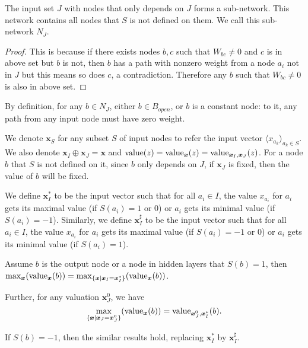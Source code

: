 				\begin{lemma}\label{lem:subnetwork2}
					The input set $J$ with nodes that only depends on $J$ forms a sub-network. This network contains all nodes that $S$ is not defined on them. We call this sub-network $N_J$.
				\end{lemma}
				
				\begin{proof}
					This is because if there exists nodes $b,c$ such that $W_{bc}\neq 0$ and $c$ is in above set but $b$ is not, then $b$ has a path with nonzero weight from a node $a_i$ not in $J$ but this means so does $c$, a contradiction. Therefore any $b$ such that $W_{bc}\neq 0$ is also in above set.
				\end{proof}
				
				By definition, for any $b\in N_J$, either $b\in B_{open}$, or $b$ is a constant node: to it, any path from any input node must have zero weight.
				
				We denote $\boldsymbol{x}_S$ for any subset $S$ of input nodes to refer the input vector $\langle x_{a_k}\rangle_{a_k\in S}$. We also denote $\boldsymbol{x}_I\oplus \boldsymbol{x}_J = \boldsymbol{x}$ and ${\textrm{value}}(z)={\textrm{value}}_{\boldsymbol{x}}(z)={\textrm{value}}_{\boldsymbol{x}_I,\boldsymbol{x}_J} (z)$. For a node $b$ that $S$ is not defined on it, since $b$ only depends on $J$, if $\boldsymbol{x}_J$ is fixed, then the value of $b$ will be fixed.
				
				We define $\boldsymbol{x}_I^*$ to be the input vector such that for all $a_i \in I$, the value $x_{a_i}$ for $a_i$ gets its maximal value (if $S(a_i)=1$ or $0$) or $a_i$ gets its minimal value (if $S(a_i)=-1$). Similarly, we define $\boldsymbol{x}_I^\sharp$ to be the input vector such that for all $a_i \in I$, the value $x_{a_i}$ for $a_i$ gets its maximal value (if $S(a_i)=-1$ or $0$) or $a_i$ gets its minimal value (if $S(a_i)=1$).
				
				
				
				\begin{lemma} \label{lem:reach_max_2}
					
					Assume $b$ is the output node or a node in hidden layers that $S(b)=1$, then
					$\max_{\boldsymbol{x}} ({\textrm{value}}_{\boldsymbol{x}}(b)) =\max_{\{\boldsymbol{x} \mid \boldsymbol{x}_I=\boldsymbol{x}^*_I\}} ({\textrm{value}}_{\boldsymbol{x}}(b))$.
					
					Further,  for any valuation $\boldsymbol{x}^0_J$, 
					we have $$\max_{\{\boldsymbol{x} \mid \boldsymbol{x}_J=\boldsymbol{x}^0_J\}} ({\textrm{value}}_{\boldsymbol{x}}(b)) =  {\textrm{value}}_{\boldsymbol{x}^0_J,\boldsymbol{x}_I^*}(b).$$
					
					If $S(b)=-1$, then the similar results hold, replacing $\boldsymbol{x}^*_I$ by $\boldsymbol{x}^\sharp_I$. 
				\end{lemma}
				
